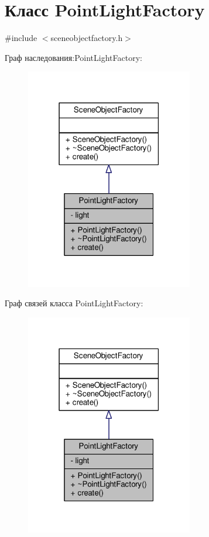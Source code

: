 \hypertarget{class_point_light_factory}{}\section{Класс Point\+Light\+Factory}
\label{class_point_light_factory}


{\ttfamily \#include $<$sceneobjectfactory.\+h$>$}



Граф наследования\+:Point\+Light\+Factory\+:
\nopagebreak
\begin{figure}[H]
\begin{center}
\leavevmode
\includegraphics[width=207pt]{d0/de9/class_point_light_factory__inherit__graph}
\end{center}
\end{figure}


Граф связей класса Point\+Light\+Factory\+:
\nopagebreak
\begin{figure}[H]
\begin{center}
\leavevmode
\includegraphics[width=207pt]{d9/df4/class_point_light_factory__coll__graph}
\end{center}
\end{figure}
